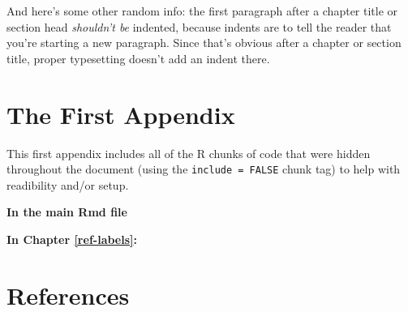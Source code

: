 \documentclass[12pt,twoside]{reedthesis}
\theoremstyle{definition}
\theoremstyle{definition}
\theoremstyle{definition}
\theoremstyle{remark}
\begin{document}
And here's some other random info: the first paragraph after a chapter
title or section head \emph{shouldn't be} indented, because indents are
to tell the reader that you're starting a new paragraph. Since that's
obvious after a chapter or section title, proper typesetting doesn't add
an indent there.

\appendix

\chapter{The First Appendix}\label{the-first-appendix}

This first appendix includes all of the R chunks of code that were
hidden throughout the document (using the \texttt{include\ =\ FALSE}
chunk tag) to help with readibility and/or setup.

\textbf{In the main Rmd file}
\begin{Shaded}
\begin{Highlighting}[]
\NormalTok{(}\OperatorTok{!}
  \NormalTok{(}\NormalTok{, } \NormalTok{)}
\NormalTok{(}\OperatorTok{!}
\OperatorTok{::}\NormalTok{(}\NormalTok{)}
\end{Highlighting}
\end{Shaded}
\textbf{In Chapter \ref{ref-labels}:}

\backmatter

\chapter*{References}\label{references}
\end{document}
